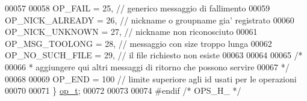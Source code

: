 \begin{DoxyCode}
00057 
00058     OP\_FAIL         = 25,  \textcolor{comment}{// generico messaggio di fallimento}
00059     OP\_NICK\_ALREADY = 26,  \textcolor{comment}{// nickname o groupname gia' registrato}
00060     OP\_NICK\_UNKNOWN = 27,  \textcolor{comment}{// nickname non riconosciuto}
00061     OP\_MSG\_TOOLONG  = 28,  \textcolor{comment}{// messaggio con size troppo lunga}
00062     OP\_NO\_SUCH\_FILE = 29,  \textcolor{comment}{// il file richiesto non esiste}
00063 
00064 
00065     \textcolor{comment}{/*}
00066 \textcolor{comment}{     * aggiungere qui altri messaggi di ritorno che possono servire}
00067 \textcolor{comment}{     */}
00068 
00069     OP\_END          = 100 \textcolor{comment}{// limite superiore agli id usati per le operazioni}
00070 
00071 \} \mbox{\hyperlink{ops_8h_ac6fa1b34da8872e34c2936391332f44c}{op\_t}};
00072 
00073 
00074 \textcolor{preprocessor}{#endif }\textcolor{comment}{/* OPS\_H\_ */}\textcolor{preprocessor}{}
\end{DoxyCode}

